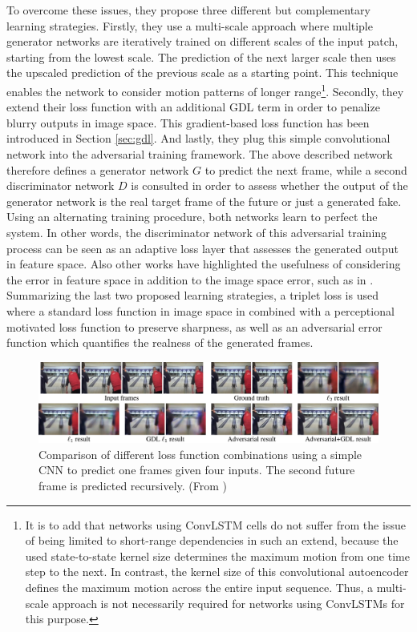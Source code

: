 To overcome these issues, they propose three different but complementary learning strategies. Firstly, they use a multi-scale approach where multiple generator networks are iteratively trained on different scales of the input patch, starting from the lowest scale. The prediction of the next larger scale then uses the upscaled prediction of the previous scale as a starting point. This technique enables the network to consider motion patterns of longer range\footnote{It is to add that networks using ConvLSTM cells do not suffer from the issue of being limited to short-range dependencies in such an extend, because the used state-to-state kernel size determines the maximum motion from one time step to the next. In contrast, the kernel size of this convolutional autoencoder defines the maximum motion across the entire input sequence. Thus, a multi-scale approach is not necessarily required for networks using ConvLSTMs for this purpose.}. Secondly, they extend their loss function with an additional GDL term in order to penalize blurry outputs in image space. This gradient-based loss function has been introduced in Section \ref{sec:gdl}. And lastly, they plug this simple convolutional network into the adversarial training framework. The above described network therefore defines a generator network $G$ to predict the next frame, while a second discriminator network $D$ is consulted in order to assess whether the output of the generator network is the real target frame of the future or just a generated fake. Using an alternating training procedure, both networks learn to perfect the system. In other words, the discriminator network of this adversarial training process can be seen as an adaptive loss layer that assesses the generated output in feature space. Also other works have highlighted the usefulness of considering the error in feature space in addition to the image space error, such as in \parencite{gen_img_perc_sim}. Summarizing the last two proposed learning strategies, a triplet loss is used where a standard loss function in image space in combined with a perceptional motivated loss function to preserve sharpness, as well as an adversarial error function which quantifies the realness of the generated frames. 

\begin{figure}[htb]
	\centering
	\includegraphics[width=1.0\linewidth]{figures/related/deep_multiscale_samples.png} 
	\caption[Comparion of Loss Functions in GAN Model]{Comparison of different loss function combinations using a simple CNN to predict one frames given four inputs. The second future frame is predicted recursively. (From \parencite{deep_multiscale_video_pred})} \label{fig:gan_samples}
\end{figure}

